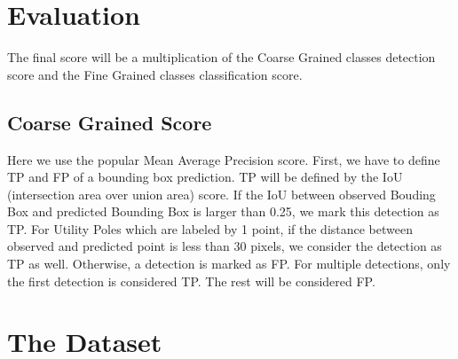 \documentclass[]{article}
\begin{document}
\section{Evaluation}
The final score will be a multiplication of the Coarse Grained classes detection score and the Fine Grained classes classification score.

\subsection{Coarse Grained Score}
Here we use the popular Mean Average Precision score. First, we have to define TP and FP of a bounding box prediction. TP will be defined by the IoU (intersection area over union area) score. If the IoU between observed Bouding Box and predicted Bounding Box is larger than 0.25, we mark this detection as TP. For Utility Poles which are labeled by 1 point, if the distance between observed and predicted point is less than 30 pixels, we consider the detection as TP as well. Otherwise, a detection is marked as FP. For multiple detections, only the first detection is considered TP. The rest will be considered FP.

\section{The Dataset}
\end{document}
